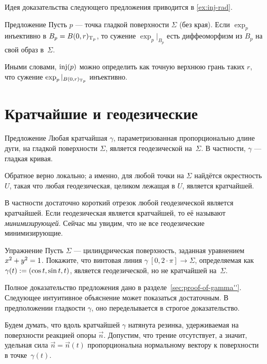 Идея доказательства следующего предложения приводится в \ref{ex:inj-rad}.

\begin{thm}{Предложение}\label{prop:inj-rad}
Пусть $p$ --- точка гладкой поверхности $\Sigma$ (без края).
Если $\exp_p$ инъективно в $B_p=B(0,r)_{\mathrm{T}_p}$, то сужение $\exp_p|_{B_p}$ есть диффеоморфизм из $B_p$ на свой образ в~$\Sigma$.
\end{thm}

Иными словами, $\mathop{\rm inj}\nolimits(p)$ можно определить как точную верхнюю грань таких $r$, что сужение $\exp_p|_{B(0,r)_{\mathrm{T}_p}}$ инъективно.

\section{Кратчайшие и геодезические}

\begin{thm}{Предложение}\label{prop:gamma''}
Любая кратчайшая $\gamma$, параметризованная пропорционально длине дуги, на гладкой поверхности $\Sigma$, является геодезической на~$\Sigma$.
В частности, $\gamma$ --- гладкая кривая.

Обратное верно локально; а именно, для любой точки на $\Sigma$ найдётся окрестность $U$, такая что любая геодезическая, целиком лежащая в $U$, является кратчайшей.
\end{thm}

В частности достаточно короткий отрезок любой геодезической является кратчайшей.
Если геодезическая является кратчайшей, то её называют \emph{минимизирующей}.
Сейчас мы увидим, что не все геодезические минимизирующие.

\begin{thm}{Упражнение}\label{ex:helix=geodesic}
Пусть $\Sigma$ --- цилиндрическая поверхность, заданная уравнением $x^2\z+y^2=1$.
Покажите, что винтовая линия $\gamma\:[0,2\cdot\pi]\to \Sigma$, определяемая как $\gamma(t)\z\df(\cos t, \sin t, t)$,
является геодезической, но не кратчайшей на~$\Sigma$.
\end{thm}

Полное доказательство предложения дано в разделе~\ref{sec:proof-of-gamma''}.
Следующее интуитивное объяснение может показаться достаточным.
В предположении гладкости $\gamma$, оно переделывается в строгое доказательство.

Будем думать, что вдоль кратчайшей $\gamma$ натянута резинка, удерживаемая на поверхности реакцией опоры $\vec n$.
Допустим, что  трение отсутствует, а значит, удельная сила $\vec n=\vec n(t)$ пропорциональна нормальному вектору к поверхности в точке~$\gamma(t)$.

